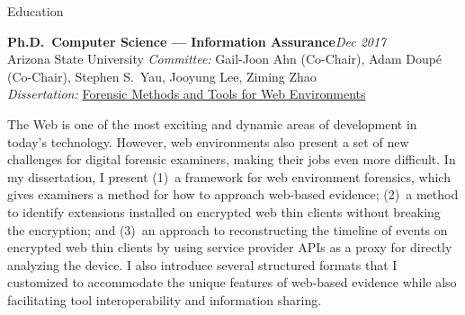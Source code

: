 

\begin{rSection}{Education}

\textbf{Ph.D.\ Computer Science --- Information Assurance}\hfill \emph{Dec 2017}\\%
Arizona State University\iftoggle{showGPA}{ | GPA 3.76}{} \hfill %
\iftoggle{fullAddress}{{1151 S Forest Ave \#140, Tempe, AZ 85281}\\}{{Tempe, AZ}\\}
\textit{Committee:} Gail-Joon Ahn (Co-Chair), Adam Doup\'{e} (Co-Chair), Stephen S.\ Yau, Jooyung Lee, Ziming Zhao\\
\textit{Dissertation:} \href{https://mikemabey.com/Dissertation_Mabey.pdf}{Forensic Methods and Tools for Web
Environments}
\begin{CVonly}\begin{quoting}

  The Web is one of the most exciting and dynamic areas of development in today's technology. However, web environments
  also present a set of new challenges for digital forensic examiners, making their jobs even more difficult. In my
  dissertation, I present (1)~a framework for web environment forensics, which gives examiners a method for how to
  approach web-based evidence; (2)~a method to identify extensions installed on encrypted web thin clients without
  breaking the encryption; and (3)~an approach to reconstructing the timeline of events on encrypted web thin clients by
  using service provider APIs as a proxy for directly analyzing the device. I also introduce several structured formats
  that I customized to accommodate the unique features of web-based evidence while also facilitating tool
  interoperability and information sharing.

\end{quoting}\end{CVonly}


\end{rSection}
